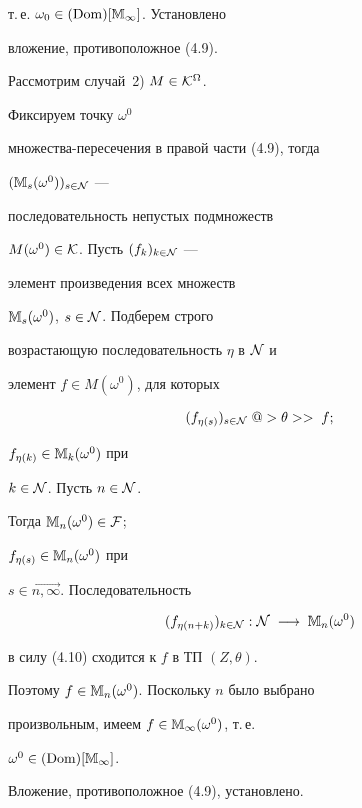 \begin{pf}
т.\,е. ${{\omega}_0} \in (\operatorname{Dom})[{\Bbb M}_\infty]$. Установлено


вложение, противоположное (4.9).


Рассмотрим случай~2) $M \in {{\cal K}^\Omega}$.


Фиксируем точку ${\omega}^0$


множества-пересечения в правой части (4.9), тогда


$({{{\Bbb M}_s}({\omega}^0)})_{s \in {\cal N}}$ ---


последовательность непустых подмножеств


${M({\omega}^0)} \in {\cal K}$. Пусть $(f_k)_{k \in {\cal N}}$ ---


элемент произведения всех множеств


${{{\Bbb M}_s}({\omega}^0)}$, $s \in {\cal N}$. Подберем строго


возрастающую последовательность $\eta$ в ${\cal N}$ и


элемент $f \in {M({\omega}^0)}$, для которых


\begin{equation}


(f_{{\eta}(s)})_{s \in {\cal N}}\;@>{\theta}>>\;f;


\end{equation}


${f_{{\eta}(k)}} \in {{{\Bbb M}_k}({\omega}^0)}$ при


$k \in {\cal N}$. Пусть $n \in {\cal N}$.


Тогда ${{{\Bbb M}_n}({\omega}^0)} \in {\cal F}$;


${f_{{\eta}(s)}} \in {{{\Bbb M}_n}({\omega}^0)}$ при


$s \in \overrightarrow{n,\infty}$. Последовательность


$$


(f_{{\eta}(n+k)})_{k \in {\cal N}}:{\cal N}\;\longrightarrow\;


{{{\Bbb M}_n}({\omega}^0)}


$$


в силу (4.10) сходится к $f$ в ТП $(Z,\theta)$.


Поэтому $f \in {{{\Bbb M}_n}({\omega}^0)}$. Поскольку $n$ было выбрано


произвольным, имеем $f \in {{{\Bbb M}_\infty}({\omega}^0)}$, т.\,е.


${{\omega}^0} \in {(\operatorname{Dom})[{\Bbb M}_\infty]}$.


Вложение, противоположное (4.9), установлено.


\end{pf}





